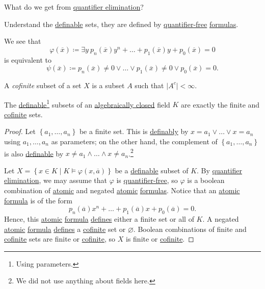 \begin{problem}
What do we get from \hyperref[def:quantifier-elimination]{quantifier elimination}?
\end{problem}
\begin{answer}
	Understand the \hyperref[def:definable]{definable} sets, they are defined by \hyperref[not:quantifier-free]{quantifier-free} \hyperref[def:formula]{formulas}.
\end{answer}

\begin{remark}
	We see that
	\[
		\varphi (\overline{x} ) \coloneqq \exists y\ p_n(\overline{x} ) y^n + \ldots + p_1(\overline{x} )y + p_0(\overline{x} ) = 0
	\]
	is equivalent to
	\[
		\psi (\overline{x} ) \coloneqq p_n(\overline{x} ) \neq 0 \lor \ldots \lor p_1(\overline{x} ) \neq 0 \lor p_0(\overline{x} ) = 0.
	\]
\end{remark}

\begin{definition}[Cofinite]\label{def:cofinite}
	A \emph{cofinite} subset of a set \(X\) is a subset \(A\) such that \(\vert A^{c} \vert < \infty \).
\end{definition}

\begin{proposition}\label{prop:lec18}
	The \hyperref[def:definable]{definable}\footnote{Using parameters.} subsets of an \hyperref[def:algebraically-closed]{algebraically closed} field \(K\) are exactly the finite and \hyperref[def:cofinite]{cofinite} sets.
\end{proposition}
\begin{proof}
	Let \(\left\{ a_1, \ldots , a_n \right\} \) be a finite set. This is \hyperref[def:definable]{definably} by \(x=a_1 \lor \ldots \lor x=a_n\) using \(a_1, \ldots , a_n\) as parameters; on the other hand, the complement of \(\left\{ a_1, \ldots , a_n  \right\} \) is also \hyperref[def:definable]{definable} by \(x \neq a_1 \land \ldots \land x\neq a_n\).\footnote{We did not use anything about fields here.}

	Let \(X=\left\{ x\in K \mid K \models \varphi (x, \overline{a} ) \right\} \) be a \hyperref[def:definable]{definable} subset of \(K\). By \hyperref[def:quantifier-elimination]{quantifier elimination}, we may assume that \(\varphi \) is \hyperref[not:quantifier-free]{quantifier-free}, so \(\varphi \) is a boolean combination of \hyperref[not:atomic]{atomic} and negated \hyperref[not:atomic]{atomic} \hyperref[def:formula]{formulas}. Notice that an \hyperref[not:atomic]{atomic} \hyperref[def:formula]{formula} is of the form
	\[
		p_n(\overline{a} ) x^n + \ldots + p_1(\overline{a} ) x + p_0(\overline{a} ) = 0.
	\]
	Hence, this \hyperref[not:atomic]{atomic} \hyperref[def:formula]{formula} \hyperref[def:definable]{defines} either a finite set or all of \(K\). A negated \hyperref[not:atomic]{atomic} \hyperref[def:formula]{formula} \hyperref[def:definable]{defines} a \hyperref[def:cofinite]{cofinite} set or \(\varnothing \). Boolean combinations of finite and \hyperref[def:cofinite]{cofinite} sets are finite or \hyperref[def:cofinite]{cofinite}, so \(X\) is finite or \hyperref[def:cofinite]{cofinite}.
\end{proof}

